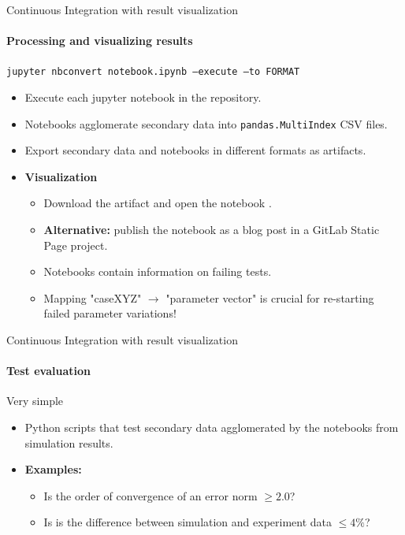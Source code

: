 \documentclass[
	aspectratio=169,%
	color={accentcolor=2d},
	logo=true,%
	colorframetitle=true,%
	]{tudabeamer}
\begin{document}
\begin{frame}{Continuous Integration with result visualization} 
    \framesubtitle{Processing and visualizing results}

    \vfill

    \texttt{jupyter nbconvert notebook.ipynb --execute --to FORMAT}

    \medskip

    \begin{itemize}
        \item Execute each jupyter notebook in the repository.
        \item Notebooks agglomerate secondary data into \texttt{pandas.MultiIndex} CSV files. 
        \item Export secondary data and notebooks in different formats as artifacts.
        \item \textbf{Visualization} 
            \begin{itemize}
                \item Download the artifact and open the notebook \faGraduationCap.
                \item \textbf{Alternative:} publish the notebook as a blog post in a GitLab Static Page project. 
                \item Notebooks contain information on failing tests. 
                \item Mapping "caseXYZ" $\to$ "parameter vector" is crucial for re-starting failed parameter variations! 
            \end{itemize}
    \end{itemize}

\end{frame}


\begin{frame}{Continuous Integration with result visualization} 
    \framesubtitle{Test evaluation}

    \vfill

    Very simple
    \begin{itemize}
        \item Python scripts that test secondary data agglomerated by the notebooks from simulation results.
        \item \textbf{Examples:} 
            \begin{itemize}
                \item Is the order of convergence of an error norm $\ge 2.0$?
                \item Is is the difference between simulation and experiment data $\le 4\%$? 
            \end{itemize}
    \end{itemize}

\end{frame}
\end{document}
